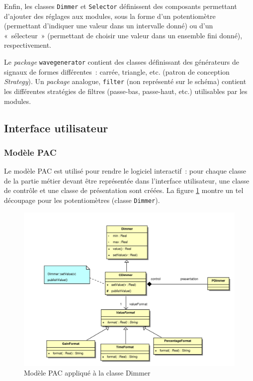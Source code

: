 Enfin, les classes \verb!Dimmer! et \verb!Selector! définissent des
composants permettant d'ajouter des réglages aux modules, sous la
forme d'un potentiomètre (permettant d'indiquer une valeur dans un
intervalle donné) ou d'un «~sélecteur~» (permettant de choisir une
valeur dans un ensemble fini donné), respectivement.

Le \emph{package} \verb!wavegenerator! contient des classes
définissant des générateurs de signaux de formes différentes~:
carrée, triangle, etc. (patron de conception
\emph{Strategy}). Un \emph{package} analogue, \verb!filter! (non
représenté sur le schéma) contient les différentes stratégies de
filtres (passe-bas, passe-haut, etc.) utilisables par les modules.

\subsection{Interface utilisateur}

\subsubsection{Modèle PAC}

Le modèle PAC est utilisé pour rendre le logiciel interactif~: pour
chaque classe de la partie métier devant être représentée dans
l'interface utilisateur, une classe de contrôle et une classe de
présentation sont créées. La figure \ref{pacdimmer-pim} montre un tel découpage pour
les potentiomètres (classe \verb!Dimmer!).

\begin{figure}[h]
\centering
\includegraphics[width=16cm]{../img/ps/pacdimmer-pim.pdf}
\caption{Modèle PAC appliqué à la classe Dimmer}
\label{pacdimmer-pim}
\end{figure}

